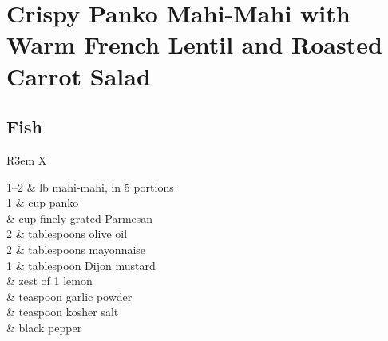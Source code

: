 \section{Crispy Panko Mahi-Mahi with Warm French Lentil and Roasted Carrot Salad}
\begin{recipe}


\begingroup
\titleformat{\subsection}[block]{\normalfont\small\bfseries}{}{0pt}{}
\titlespacing*{\subsection}{0pt}{.35em}{.1em}
\renewcommand{\arraystretch}{.82}
\setlength{\tabcolsep}{2pt}
\setlength{\parskip}{.25em}
\renewcommand\ingredients[1]{
    \sffamily
    \bfseries
    \begin{tabularx}{\linewidth}{ R{3em} X }
        #1
    \end{tabularx}
    \vspace{.2em}
    \mdseries
}
\footnotesize

\subsection{Fish}
\ingredients{
    1--2 & lb mahi-mahi, in 5 portions \\
    1 & cup panko \\
    \sfrac{1}{3} & cup finely grated Parmesan \\
    2 & tablespoons olive oil \\
    2 & tablespoons mayonnaise \\
    1 & tablespoon Dijon mustard \\
    & zest of 1 lemon \\
    \sfrac{1}{2} & teaspoon garlic powder \\
    \sfrac{1}{2} & teaspoon kosher salt \\
    & black pepper \\
}


\end{recipe}
